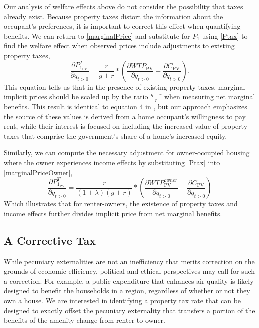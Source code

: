 \documentclass[ecta,nameyear,draft]{econsocart}
\theoremstyle{plain}
\theoremstyle{remark}
\begin{document}
Our analysis of welfare effects above do not consider the possibility that taxes already exist. Because property taxes distort the information about the occupant's preferences, it is important to correct this effect when quantifying benefits. We can return to \ref{marginalPrice} and substitute for $P_1$ using \ref{Ptax} to find the welfare effect when observed prices include adjustments to existing property taxes,
\begin{equation}
\frac{\partial P^T_{1_{\mathrm{PV}}}} {\partial q_{t>0}}=\frac{r}{g+r}*\left(\frac{\partial \mathit{WTP}_{\mathrm{PV}}}{\partial q_{t>0}}-\frac{\partial C_{\mathrm{PV}}}{\partial q_{t>0}}\right). \nonumber %
\end{equation}
This equation tells us that in the presence of existing property taxes, marginal implicit prices should be scaled up by the ratio $\frac{g+r}{r}$ when measuring net marginal benefits. This result is identical to equation 4 in \cite{niskanen77}, but our approach emphasizes the source of these values is derived from a home occupant's willingness to pay rent, while their interest is focused on including the increased value of property taxes that comprise the government's share of a home's increased equity.

Similarly, we can compute the necessary adjustment for owner-occupied housing where the owner experiences income effects by substituting \ref{Ptax} into \ref{marginalPriceOwner},
\begin{equation}
\frac{\partial P^T_{1_{\mathrm{PV}}}} {\partial q_{t>0}}=\frac{r}{(1+\lambda)(g+r)}*\left(
\frac{\partial \mathit{WTP}^{\mathit{owner}}_{\mathrm{PV}}}{\partial q_{t>0}}-\frac{\partial C_{\mathrm{PV}}}{\partial q_{t>0}}\right) \label{marginalPriceOwnerT}
\end{equation}
Which illustrates that for renter-owners, the existence of property taxes and income effects further divides implicit price from net marginal benefits.

\subsection{A Corrective Tax}
While pecuniary externalities are not an inefficiency that merits correction on the grounds of economic efficiency, political and ethical perspectives may call for such a correction. For example, a public expenditure that enhances air quality is likely designed to benefit the households in a region, regardless of whether or not they own a house. We are interested in identifying a property tax rate that can be designed to exactly offset the pecuniary externality that transfers a portion of the benefits of the amenity change from renter to owner.
\end{document}
